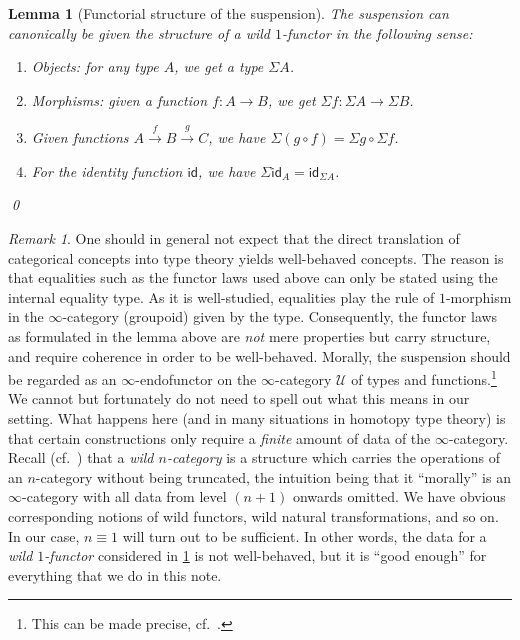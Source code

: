 \documentclass[11pt,a4paper,oneside,reqno]{amsart}
\newtheorem{lemma}[theorem]{Lemma}
\theoremstyle{definition}
\theoremstyle{remark}
\newtheorem{remark}[theorem]{Remark}
\newcommand{\UU}{\mathcal{U}}
\newcommand{\idf}{\mathsf{id}}
\begin{document}
\begin{lemma}[Functorial structure of the suspension] \label{lem:Susp-is-functor}
 The suspension can canonically be given the structure of a \emph{wild $1$-functor} in the following sense:
 \begin{enumerate}
  \item \emph{Objects:} for any type $A$, we get a type $\Sigma A$.
  \item \emph{Morphisms:} given a function $f : A \to B$, we get $\Sigma f : \Sigma A \to \Sigma B$.
  \item Given functions $A \xrightarrow f B \xrightarrow g C$, we have $\Sigma(g \circ f) = \Sigma g \circ \Sigma f$. \label{eq:susp-law1}
  \item For the identity function $\idf$, we have $\Sigma \idf_A = \idf_{\Sigma A}$. \label{eq:susp-law2}
 \end{enumerate}
 \qed
\end{lemma}

\begin{remark} \label{rem:wildness}
One should in general not expect that the direct translation of categorical concepts into type theory yields well-behaved concepts.
The reason is that equalities such as the functor laws used above can only be stated using the internal equality type.
As it is well-studied, equalities play the rule of $1$-morphism in the $\infty$-category (groupoid) given by the type.
Consequently, the functor laws as formulated in the lemma above are \emph{not} mere properties but carry structure, and require coherence in order to be well-behaved.
Morally, the suspension should be regarded as an $\infty$-endofunctor on the $\infty$-category $\UU$ of types and functions.\footnote{This can be made precise, cf.\ \cite{ann-cap-kra:two-level}.}
We cannot but fortunately do not need to spell out what this means in our setting.
What happens here (and in many situations in homotopy type theory) is that certain constructions only require a \emph{finite} amount of data of the $\infty$-category.
Recall (cf.\ \cite{capKra_semisegal}) that a \emph{wild $n$-category} is a structure which carries the operations of an $n$-category without being truncated, the intuition being that it ``morally'' is an $\infty$-category with all data from level $(n+1)$ onwards omitted.
We have obvious corresponding notions of wild functors, wild natural transformations, and so on.
In our case, $n \equiv 1$ will turn out to be sufficient.
In other words, the data for a \emph{wild $1$-functor} considered in \cref{lem:Susp-is-functor} is not well-behaved, but it is ``good enough'' for everything that we do in this note.
\end{remark}
\end{document}
